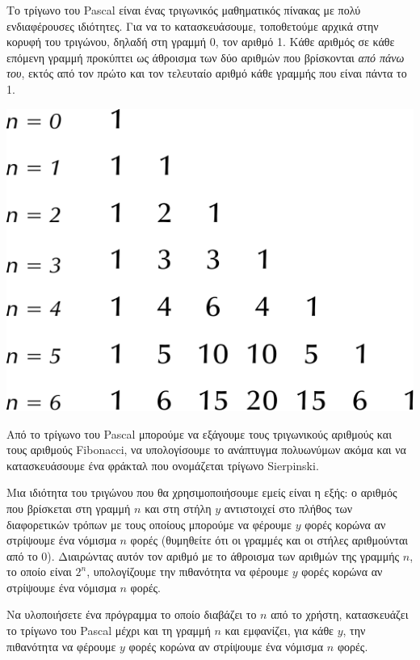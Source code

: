 \documentclass[a4paper,11pt,oneside]{book}
\begin{document}
\begin{exercise}
Το τρίγωνο του Pascal είναι ένας τριγωνικός μαθηματικός πίνακας με πολύ ενδιαφέρουσες ιδιότητες. Για να το κατασκευάσουμε, τοποθετούμε αρχικά στην κορυφή του τριγώνου, δηλαδή στη γραμμή 0, τον αριθμό 1. Kάθε αριθμός σε κάθε επόμενη γραμμή προκύπτει ως άθροισμα των δύο αριθμών που βρίσκονται \emph{από πάνω του}, εκτός από τον πρώτο και τον τελευταίο αριθμό κάθε γραμμής που είναι πάντα το 1.

\begin{center}
    \includegraphics[scale=0.5]{illustrations/pascal-right.pdf}
\end{center}

Από το τρίγωνο του Pascal μπορούμε να εξάγουμε τους τριγωνικούς αριθμούς και τους αριθμούς Fibonacci, να υπολογίσουμε το ανάπτυγμα πολυωνύμων ακόμα και να κατασκευάσουμε ένα φράκταλ που ονομάζεται τρίγωνο Sierpinski. 

Μια ιδιότητα του τριγώνου που θα χρησιμοποιήσουμε εμείς είναι η εξής: ο αριθμός που βρίσκεται στη γραμμή $n$ και στη στήλη $y$ αντιστοιχεί στο πλήθος των διαφορετικών τρόπων με τους οποίους μπορούμε να φέρουμε $y$ φορές κορώνα αν στρίψουμε ένα νόμισμα $n$ φορές (θυμηθείτε ότι οι γραμμές και οι στήλες αριθμούνται από το 0). Διαιρώντας αυτόν τον αριθμό με το άθροισμα των αριθμών της γραμμής $n$, το οποίο είναι $2^n$, υπολογίζουμε την πιθανότητα να φέρουμε $y$ φορές κορώνα αν στρίψουμε ένα νόμισμα $n$ φορές.

Να υλοποιήσετε ένα πρόγραμμα το οποίο διαβάζει το $n$ από το χρήστη, κατασκευάζει το τρίγωνο του Pascal μέχρι και τη γραμμή $n$ και εμφανίζει, για κάθε $y$, την πιθανότητα να φέρουμε $y$ φορές κορώνα αν στρίψουμε ένα νόμισμα $n$ φορές.
\end{exercise}
\end{document}
